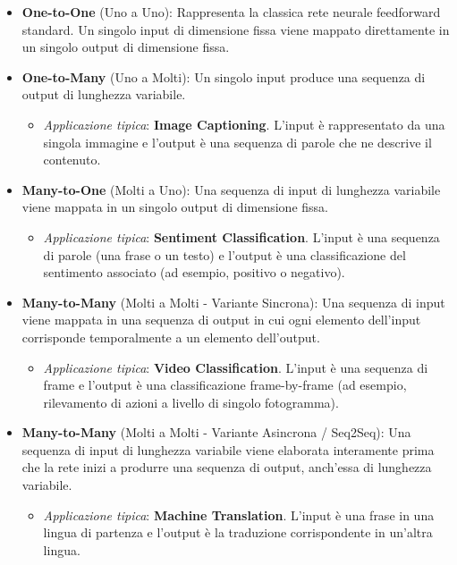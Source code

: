 ﻿\documentclass[11pt, a4paper]{article}
\begin{document}
\begin{itemize}[noitemsep]
    \item \textbf{One-to-One} (Uno a Uno): Rappresenta la classica rete neurale feedforward standard. Un singolo input di dimensione fissa viene mappato direttamente in un singolo output di dimensione fissa.
    \item \textbf{One-to-Many} (Uno a Molti): Un singolo input produce una sequenza di output di lunghezza variabile.
    \begin{itemize}[noitemsep]
        \item \emph{Applicazione tipica}: \textbf{Image Captioning}. L'input è rappresentato da una singola immagine e l'output è una sequenza di parole che ne descrive il contenuto.
    \end{itemize}
    \item \textbf{Many-to-One} (Molti a Uno): Una sequenza di input di lunghezza variabile viene mappata in un singolo output di dimensione fissa.
    \begin{itemize}[noitemsep]
        \item \emph{Applicazione tipica}: \textbf{Sentiment Classification}. L'input è una sequenza di parole (una frase o un testo) e l'output è una classificazione del sentimento associato (ad esempio, positivo o negativo).
    \end{itemize}
    \item \textbf{Many-to-Many} (Molti a Molti - Variante Sincrona): Una sequenza di input viene mappata in una sequenza di output in cui ogni elemento dell'input corrisponde temporalmente a un elemento dell'output.
    \begin{itemize}[noitemsep]
        \item \emph{Applicazione tipica}: \textbf{Video Classification}. L'input è una sequenza di frame e l'output è una classificazione frame-by-frame (ad esempio, rilevamento di azioni a livello di singolo fotogramma).
    \end{itemize}
    \item \textbf{Many-to-Many} (Molti a Molti - Variante Asincrona / Seq2Seq): Una sequenza di input di lunghezza variabile viene elaborata interamente prima che la rete inizi a produrre una sequenza di output, anch'essa di lunghezza variabile.
    \begin{itemize}[noitemsep]
        \item \emph{Applicazione tipica}: \textbf{Machine Translation}. L'input è una frase in una lingua di partenza e l'output è la traduzione corrispondente in un'altra lingua.
    \end{itemize}
\end{itemize}
\end{document}
